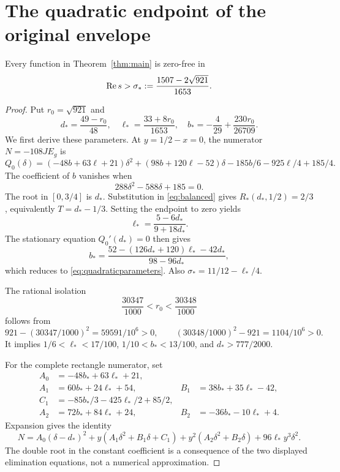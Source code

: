 \section{The quadratic endpoint of the original envelope}\label{sec:quadratic}
\begin{theorem}\label{thm:quadratic}
Every function in Theorem~\ref{thm:main} is zero-free in
\[
 \operatorname{Re} s>\sigma_*:=\frac{1507-2\sqrt{921}}{1653}.
\]
\end{theorem}
\begin{proof}
Put $r_0=\sqrt{921}$ and
\begin{equation}\label{eq:quadraticparameters}
 d_*=\frac{49-r_0}{48},\quad
 \ell_*=\frac{33+8r_0}{1653},\quad
 b_*=-\frac4{29}+\frac{230r_0}{26709}.
\end{equation}
We first derive these parameters. At $y=1/2-x=0$, the numerator $N=-108JE_g$ is
\[
 Q_0(\delta)=(-48b+63\ell+21)\delta^2
 +(98b+120\ell-52)\delta-185b/6-925\ell/4+185/4.
\]
The coefficient of $b$ vanishes when
\[
 288\delta^2-588\delta+185=0.
\]
The root in $[0,3/4]$ is $d_*$. Substitution in \eqref{eq:balanced} gives $R_*(d_*,1/2)=2/3$, equivalently $T=d_*-1/3$. Setting the endpoint to zero yields
\[
 \ell_*=\frac{5-6d_*}{9+18d_*}.
\]
The stationary equation $Q_0'(d_*)=0$ then gives
\[
 b_*=\frac{52-(126d_*+120)\ell_*-42d_*}{98-96d_*},
\]
which reduces to \eqref{eq:quadraticparameters}. Also $\sigma_*=11/12-\ell_*/4$.

The rational isolation
\begin{equation}\label{eq:sqrtisolation}
 \frac{30347}{1000}<r_0<\frac{30348}{1000}
\end{equation}
follows from
\[
 921-(30347/1000)^2=59591/10^6>0,\qquad
 (30348/1000)^2-921=1104/10^6>0.
\]
It implies $1/6<\ell_*<17/100$, $1/10<b_*<13/100$, and $d_*>777/2000$.

For the complete rectangle numerator, set
\begin{align*}
 A_0&=-48b_*+63\ell_*+21,\\
 A_1&=60b_*+24\ell_*+54,&B_1&=38b_*+35\ell_*-42,\\
 C_1&=-85b_*/3-425\ell_*/2+85/2,\\
 A_2&=72b_*+84\ell_*+24,&B_2&=-36b_*-10\ell_*+4.
\end{align*}
Expansion gives the identity
\begin{equation}\label{eq:quadraticpoly}
 N=A_0(\delta-d_*)^2+y(A_1\delta^2+B_1\delta+C_1)
                  +y^2(A_2\delta^2+B_2\delta)+96\ell_*y^3\delta^2.
\end{equation}
The double root in the constant coefficient is a consequence of the two displayed elimination equations, not a numerical approximation.


\end{proof}
